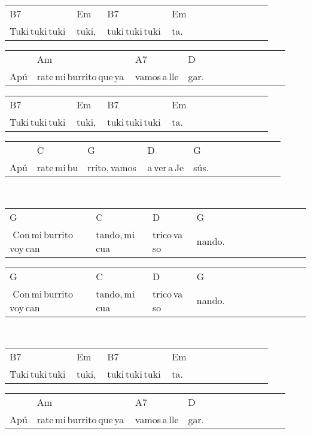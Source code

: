 \begin{multicols}{2}
\noindent
\begin{minipage}{\columnwidth}
\noindent
\noindent
\begin{tabular}{llllllllllll}
B7&Em&B7&Em\\
Tuki\,tuki\,tuki\,&tuki,\,&tuki\,tuki\,tuki\,&ta.
\end{tabular}

\noindent
\begin{tabular}{llllllllllll}
&Am&A7&D\\
Apú&rate\,mi\,burrito\,que\,ya\,&vamos\,a\,lle&gar.
\end{tabular}

\noindent
\begin{tabular}{llllllllllll}
B7&Em&B7&Em\\
Tuki\,tuki\,tuki\,&tuki,\,&tuki\,tuki\,tuki\,&ta.
\end{tabular}

\noindent
\begin{tabular}{llllllllllll}
&C&G&D&G\\
Apú&rate\,mi\,bu&rrito,\,vamos\,&a\,ver\,a\,Je&sús.
\end{tabular}
\end{minipage}\\

\noindent
\begin{minipage}{\columnwidth}
\noindent
\noindent
\begin{tabular}{llllllllllll}
G&C&D&G\\
\,\,Con\,mi\,burrito\,voy\,can&tando,\,mi\,cua&trico\,va\,so&nando.
\end{tabular}

\noindent
\begin{tabular}{llllllllllll}
G&C&D&G\\
\,\,Con\,mi\,burrito\,voy\,can&tando,\,mi\,cua&trico\,va\,so&nando.
\end{tabular}
\end{minipage}\\


\chorus{}

\noindent
\begin{minipage}{\columnwidth}
\noindent
\noindent
\begin{tabular}{llllllllllll}
B7&Em&B7&Em\\
Tuki\,tuki\,tuki\,&tuki,\,&tuki\,tuki\,tuki\,&ta.
\end{tabular}

\noindent
\begin{tabular}{llllllllllll}
&Am&A7&D\\
Apú&rate\,mi\,burrito\,que\,ya\,&vamos\,a\,lle&gar.
\end{tabular}


\end{minipage}
\end{multicols}
